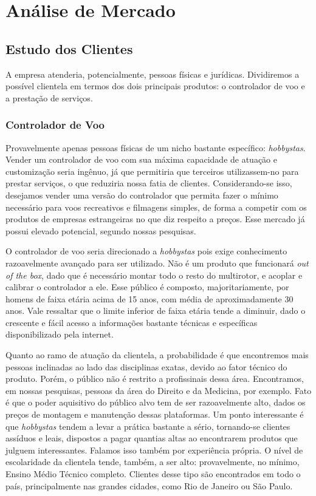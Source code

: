 \section{Análise de Mercado}

\subsection{Estudo dos Clientes}

A empresa atenderia, potencialmente, pessoas físicas e jurídicas. Dividiremos a possível clientela em termos
dos dois principais produtos: o controlador de voo e a prestação de serviços.

\subsubsection*{Controlador de Voo}

Provavelmente apenas pessoas físicas de um nicho bastante específico: \emph{hobbystas}. Vender um controlador
de voo com sua máxima capacidade de atuação e customização seria ingênuo, já que permitiria que terceiros utilizassem-no
para prestar serviços, o que reduziria nossa fatia de clientes. Considerando-se isso, desejamos vender uma versão
do controlador que permita fazer o mínimo necessário para voos recreativos e filmagens simples, de forma a competir
com os produtos de empresas estrangeiras no que diz respeito a preços. Esse mercado já possui elevado potencial, segundo
nossas pesquisas.

O controlador de voo seria direcionado a \emph{hobbystas} pois exige conhecimento razoavelmente avançado para ser utilizado.
Não é um produto que funcionará \emph{out of the box}, dado que é necessário montar todo o resto do multirotor, e acoplar e calibrar
o controlador a ele. Esse público é composto, majoritariamente, por homens de faixa etária acima de 15 anos, com média de aproximadamente
30 anos. Vale ressaltar que o limite inferior de faixa etária tende a diminuir, dado o crescente e fácil acesso a informações bastante técnicas
e específicas disponibilizado pela internet.

Quanto ao ramo de atuação da clientela, a probabilidade é que encontremos mais pessoas inclinadas ao lado das disciplinas exatas,
devido ao fator técnico do produto. Porém, o público não é restrito a profissinais dessa área. Encontramos, em nossas pesquisas,
pessoas da área do Direito e da Medicina, por exemplo. Fato é que o poder aquisitivo do público alvo tem de ser razoavelmente alto,
dados os preços de montagem e manutenção dessas plataformas. Um ponto interessante é que \emph{hobbystas} tendem a levar a prática
bastante a sério, tornando-se clientes assíduos e leais, dispostos a pagar quantias altas ao encontrarem produtos que julguem 
interessantes. Falamos isso também por experiência própria. O nível de escolaridade da clientela tende, também, a ser alto: 
provavelmente, no mínimo, Ensino Médio Técnico completo. Clientes desse tipo são encontrados em todo o país, principalmente nas
grandes cidades, como Rio de Janeiro ou São Paulo.

